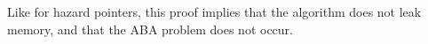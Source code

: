 Like for hazard pointers, this proof implies that the algorithm does not leak
memory, and that the ABA problem does not occur.



